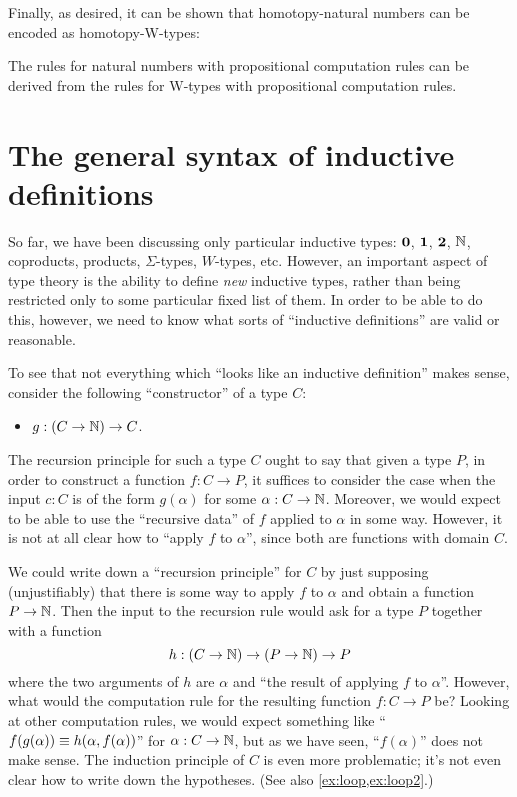 Finally, as desired, it can be shown that homotopy-natural numbers can be encoded as homotopy-W-types:

\begin{thm}
The rules for natural numbers with propositional computation rules can be derived from the rules for W-types with propositional computation rules.
\end{thm}


\section{The general syntax of inductive definitions}
\label{sec:strictly-positive}

So far, we have been discussing only particular inductive types: $\mathbf{0}$, $\mathbf{1}$, $\mathbf{2}$, $\mathbb{N}$, coproducts, products, $\Sigma$-types, $W$-types, etc.
However, an important aspect of type theory is the ability to define \emph{new} inductive types, rather than being restricted only to some particular fixed list of them.
In order to be able to do this, however, we need to know what sorts of ``inductive definitions'' are valid or reasonable.

To see that not everything which ``looks like an inductive definition'' makes sense, consider the following ``constructor'' of a type $C$:
\begin{itemize}
\item $g:(C\to \mathbb{N}) \to C$.
\end{itemize}
The recursion principle for such a type $C$ ought to say that given a type $P$, in order to construct a function $f:C\to P$, it suffices to consider the case when the input $c:C$ is of the form $g(\alpha)$ for some $\alpha:C\to\mathbb{N}$.
Moreover, we would expect to be able to use the ``recursive data'' of $f$ applied to $\alpha$ in some way.
However, it is not at all clear how to ``apply $f$ to $\alpha$'', since both are functions with domain $C$.

We could write down a ``recursion principle'' for $C$ by just supposing (unjustifiably) that there is some way to apply $f$ to $\alpha$ and obtain a function $P\to\mathbb{N}$.
Then the input to the recursion rule would ask for a type $P$ together with a function
\begin{equation}
  h:(C\to\nat) \to (P\to\nat) \to P\label{eq:fake-recursor}
\end{equation}
where the two arguments of $h$ are $\alpha$ and ``the result of applying $f$ to $\alpha$''.
However, what would the computation rule for the resulting function $f:C\to P$ be?
Looking at other computation rules, we would expect something like ``$f(g(\alpha)) \equiv h(\alpha,f(\alpha))$'' for $\alpha:C\to\mathbb{N}$, but as we have seen, ``$f(\alpha)$'' does not make sense.
The induction principle of $C$ is even more problematic; it's not even clear how to write down the hypotheses.
(See also \autoref{ex:loop,ex:loop2}.)

